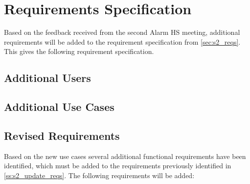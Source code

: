 \section{Requirements Specification} \label{sec:s3_requirements}


Based on the feedback received from the second Alarm HS meeting, additional requirements will be added to the requirement specification from \cref{sec:s2_reqs}. This gives the following requirement specification.

\subsection{Additional Users} \label{ss:s3_users}

\subsection{Additional Use Cases \label{ss:s3_uc}}

\subsection{Revised Requirements} \label{ss:s2_reqs}
Based on the new use cases several additional functional requirements have been identified, which must be added to the requirements previously identified in \cref{ss:s2_update_reqs}. The following requirements will be added:

